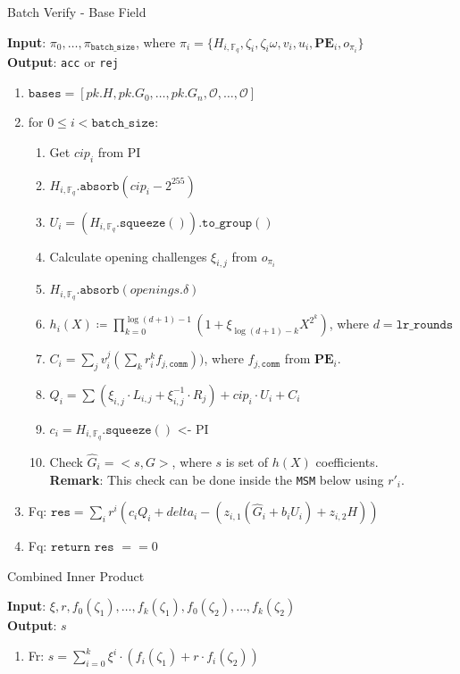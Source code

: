 \begin{algorithm}[H]
    \caption{Batch Verify - Base Field}
    \textbf{Input}: $\pi_0, \dots, \pi_{\texttt{batch\_size}}$, where $\pi_i = \{H_{i, \mathbb{F}_q}, \zeta_i, \zeta_i\omega, v_i, u_i,
    \textbf{PE}_i, o_{\pi_i} \}$ \\
    \textbf{Output}: \texttt{acc} or \texttt{rej}
    \begin{enumerate}
        \item $\texttt{bases} = [pk.H, pk.G_0, \dots, pk.G_n, \mathcal{O}, \dots, \mathcal{O}]$
        \item for $0 \leq i < \texttt{batch\_size}$:
        \begin{enumerate}
        	  \item Get $cip_i$ from PI
            \item $H_{i, \mathbb{F}_q}.\texttt{absorb}(cip_i - 2^{255})$
            \item $U_i = (H_{i, \mathbb{F}_q}.\texttt{squeeze}()).\texttt{to\_group}()$
            \item Calculate opening challenges $\xi_{i, j}$ from $o_{\pi_i}$
            \item $H_{i, \mathbb{F}_q}.\texttt{absorb}(openings.\delta)$
            \item $h_i(X) \coloneqq \prod_{k=0}^{\log(d+1) - 1}(1 + \xi_{\log(d+1)-k}X^{2^k})$, where $d = \texttt{lr\_rounds}$
            \item $C_i = \sum\limits_{j}v_i^j(\sum\limits_{k}r_i^k f_{j, \texttt{comm}}))$, where $f_{j, \texttt{comm}}$ from $\textbf{PE}_i$.
            \item $Q_i = \sum (\xi_{i, j} \cdot L_{i, j} + \xi_{i, j}^{-1} \cdot R_j) + cip_i \cdot U_i + C_i$
            \item $c_i = H_{i, \mathbb{F}_q}.\texttt{squeeze}()$ <- PI
            \item Check $\hat{G}_i = <s, G>$, where $s$ is set of $h(X)$ coefficients. \\
            \textbf{Remark}: This check can be done inside the \texttt{MSM} below using $r'_i$.
        \end{enumerate}
        \item Fq: $\texttt{res} = \sum\limits_i r^i (c_i Q_i + delta_i - ( z_{i, 1} (\hat{G}_i + b_i U_i) + z_{i, 2} H ))$
        \item Fq: $\texttt{return res } == 0$
    \end{enumerate}
\end{algorithm}

\begin{algorithm}[H]
    \caption{Combined Inner Product}
    \textbf{Input}: $\xi, r, f_0(\zeta_1), \dots, f_k(\zeta_1), f_0(\zeta_2), \dots, f_k(\zeta_2)$ \\ %
    \textbf{Output}: $s$
    \begin{enumerate}
        \item Fr: $s = \sum\limits_{i = 0}^{k} \xi^i \cdot (f_i(\zeta_1) + r \cdot f_i(\zeta_2))$
    \end{enumerate}
\end{algorithm}